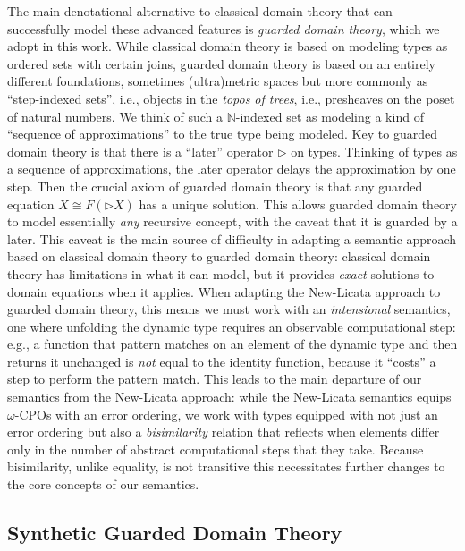 The main denotational alternative to classical domain theory that can
successfully model these advanced features is \emph{guarded domain
theory}, which we adopt in this work. While classical domain theory is
based on modeling types as ordered sets with certain joins, guarded
domain theory is based on an entirely different foundations, sometimes
(ultra)metric spaces but more commonly as ``step-indexed sets'', i.e.,
objects in the \emph{topos of trees}, i.e., presheaves on the poset of
natural numbers\cite{topos-of-trees}. We think of such a
$\mathbb{N}$-indexed set as modeling a kind of ``sequence of
approximations'' to the true type being modeled.
%
Key to guarded domain theory is that there is a ``later'' operator
$\triangleright$ on types. Thinking of types as a sequence of
approximations, the later operator delays the approximation by one
step. Then the crucial axiom of guarded domain theory is that any
guarded equation $X \cong F(\triangleright X)$ has a unique
solution. This allows guarded domain theory to model essentially
\emph{any} recursive concept, with the caveat that it is guarded by a
later.
%
This caveat is the main source of difficulty in adapting a semantic
approach based on classical domain theory to guarded domain theory:
classical domain theory has limitations in what it can model, but it
provides \emph{exact} solutions to domain equations when it
applies. When adapting the New-Licata approach to guarded domain
theory, this means we must work with an \emph{intensional} semantics,
one where unfolding the dynamic type requires an observable
computational step: e.g., a function that pattern matches on an
element of the dynamic type and then returns it unchanged is
\emph{not} equal to the identity function, because it ``costs'' a step
to perform the pattern match.
%
This leads to the main departure of our semantics from the New-Licata
approach: while the New-Licata semantics equips $\omega$-CPOs with an
error ordering, we work with types equipped with not just an error
ordering but also a \emph{bisimilarity} relation that reflects when
elements differ only in the number of abstract computational steps
that they take.
%
Because bisimilarity, unlike equality, is not transitive this
necessitates further changes to the core concepts of our semantics.

\subsection{Synthetic Guarded Domain Theory}

